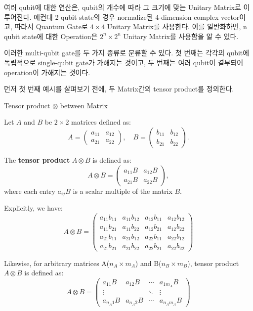 여러 qubit에 대한 연산은, qubit의 개수에 따라 그 크기에 맞는 Unitary Matrix로 이루어진다. 예컨대 2 qubit state의 경우 normalize된 4-dimension complex vector이고, 따라서 Quantum Gate로 \(4 \times 4\) Unitary Matrix를 사용한다. 이를 일반화하면, n qubit state에 대한 Operation은 \(2^n \times 2^n\) Unitary Matrix를 사용함을 알 수 있다.

이러한 multi-qubit gate를 두 가지 종류로 분류할 수 있다. 첫 번째는 각각의 qubit에 독립적으로 single-qubit gate가 가해지는 것이고, 두 번째는 여러 qubit이 결부되어 operation이 가해지는 것이다.

\noindent 먼저 첫 번째 예시를 살펴보기 전에, 두 Matrix간의 tensor product를 정의한다.
\begin{definition}
Tensor product \(\otimes\) between Matrix

Let \( A \) and \( B \) be \(2 \times 2\) matrices defined as:
\[
A = \begin{pmatrix}
a_{11} & a_{12} \\
a_{21} & a_{22}
\end{pmatrix}, \quad
B = \begin{pmatrix}
b_{11} & b_{12} \\
b_{21} & b_{22}
\end{pmatrix}.
\]

The \textbf{tensor product} \( A \otimes B \) is defined as:
\[
A \otimes B =
\begin{pmatrix}
a_{11}B & a_{12}B \\
a_{21}B & a_{22}B
\end{pmatrix},
\]
where each entry \( a_{ij}B \) is a scalar multiple of the matrix \( B \).

Explicitly, we have:
\[
A \otimes B =
\begin{pmatrix}
a_{11}b_{11} & a_{11}b_{12} & a_{12}b_{11} & a_{12}b_{12} \\
a_{11}b_{21} & a_{11}b_{22} & a_{12}b_{21} & a_{12}b_{22} \\
a_{21}b_{11} & a_{21}b_{12} & a_{22}b_{11} & a_{22}b_{12} \\
a_{21}b_{21} & a_{21}b_{22} & a_{22}b_{21} & a_{22}b_{22}
\end{pmatrix}
\]

Likewise, for arbitrary matrices A(\(n_A \times m_A\)) and B(\(n_B \times m_B\)), tensor product \( A \otimes B \) is defined as:
\[
A \otimes B =
\begin{pmatrix}
a_{11}B & a_{12}B & \cdots & a_{1m_A}B \\
\vdots &          & \ddots & \vdots  \\
a_{n_A 1}B & a_{n_A 2}B & \cdots & a_{n_A m_A}B
\end{pmatrix}
\]
\end{definition}

